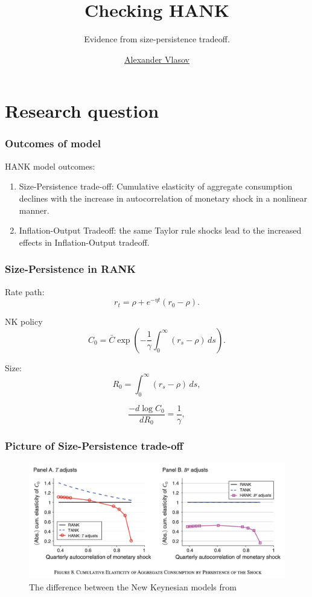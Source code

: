 \documentclass[11pt,pdf,aspectratio=129]{beamer}
\title{Checking HANK}
\subtitle{Evidence from size-persistence tradeoff.}
\author{\href{mailto://avlasov@nes.ru}{Alexander Vlasov}}
\institute{NES}
\begin{document}
\begin{frame}[fragile]
    \titlepage
\end{frame}


\section{Research question}



\begin{frame}\frametitle{Outcomes of \citet{KMV2018} model}
    \citet{KMV2018} HANK model outcomes:
    \begin{enumerate}
        \item Size-Persistence trade-off: Cumulative elasticity of aggregate consumption declines with the increase in autocorrelation of monetary shock in a nonlinear manner.
        \item Inflation-Output Tradeoff: the same Taylor rule shocks lead to the increased effects in Inflation-Output tradeoff.
    \end{enumerate}


  
\end{frame}


\begin{frame}\frametitle{Size-Persistence in RANK}
Rate path:
    \begin{equation*}
        r_t=\rho+e^{-\eta t}(r_0-\rho).\label{eq:InterestRatePath}
    \end{equation*}

NK policy    
\[C_0=\bar C\exp\left(-\frac{1}{\gamma}\int_0^\infty \left(r_s-\rho\right)\,ds\right).\]

Size:
\begin{equation*}
    R_0=\int_0^\infty \left(r_s-\rho\right)\,ds,\label{eq:KMVsize}
\end{equation*}


\[\frac{-d \log C_0}{dR_0}=\frac{1}{\gamma},\]


\end{frame}

\begin{frame}\frametitle{Picture of Size-Persistence trade-off}
    \begin{figure}\centering
        \includegraphics[scale=0.47]{Size_Persistence_KMV.png}
        \caption{The difference between the New Keynesian models from \citet{KMV2018}}
    \end{figure}
\end{frame}
\end{document}
